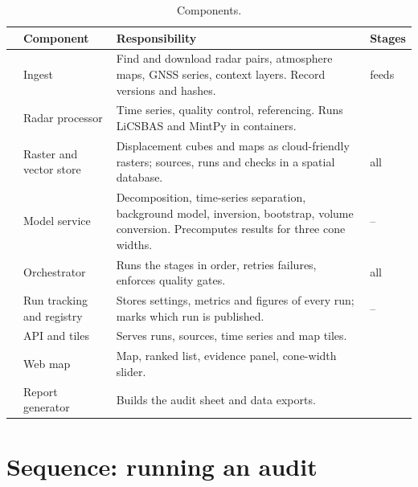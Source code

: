 {\small
\begin{xltabular}{\linewidth}{@{}L{8mm}L{31mm}Y L{17mm}@{}}
\caption{Components.}\label{tab:components}\\*
\toprule
 & \textbf{Component} & \textbf{Responsibility} & \textbf{Stages}\\*
\midrule
{} & Ingest & Find and download radar pairs, atmosphere maps, GNSS series, context layers. Record
  versions and hashes. & feeds \\
 & Radar processor & Time series, quality control, referencing. Runs LiCSBAS and MintPy in
  containers. &  \\
 & Raster and vector store & Displacement cubes and maps as cloud-friendly rasters; sources,
  runs and checks in a spatial database. & all\\
 & Model service & Decomposition, time-series separation, background model, inversion, bootstrap,
  volume conversion. Precomputes results for three cone widths. & --\\
 & Orchestrator & Runs the stages in order, retries failures, enforces quality gates. & all\\
 & Run tracking and registry & Stores settings, metrics and figures of every run; marks which
  run is published. & --\\
 & API and tiles & Serves runs, sources, time series and map tiles. & \\
 & Web map & Map, ranked list, evidence panel, cone-width slider. & \\
 & Report generator & Builds the audit sheet and data exports. & \\
\bottomrule
\end{xltabular}}

\clearpage
\section{Sequence: running an audit}

